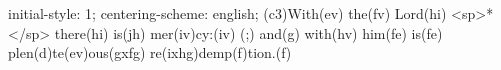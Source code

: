 initial-style: 1;
centering-scheme: english;
(c3)With(ev) the(fv) Lord(hi) <sp>*</sp> there(hi) is(jh) mer(iv)cy:(iv) (;) and(g) with(hv) him(fe) is(fe) plen(d)te(ev)ous(gxfg) re(ixhg)demp(f)tion.(f)
